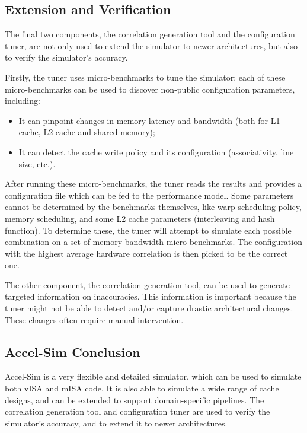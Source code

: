 \subsection{Extension and Verification}\label{subsec:extension-and-verification}
The final two components, the correlation generation tool and the configuration tuner, are not only used to extend the simulator to newer architectures, but also to verify the simulator's accuracy.

Firstly, the tuner uses micro-benchmarks to tune the simulator; each of these micro-benchmarks can be used to discover non-public configuration parameters, including:
\begin{itemize}
    \item It can pinpoint changes in memory latency and bandwidth (both for L1 cache, L2 cache and shared memory);
    \item It can detect the cache write policy and its configuration (associativity, line size, etc.).
\end{itemize}

After running these micro-benchmarks, the tuner reads the results and provides a configuration file which can be fed to the performance model.
Some parameters cannot be determined by the benchmarks themselves, like warp scheduling policy, memory scheduling, and some L2 cache parameters (interleaving and hash function).
To determine these, the tuner will attempt to simulate each possible combination on a set of memory bandwidth micro-benchmarks.
The configuration with the highest average hardware correlation is then picked to be the correct one.

\vspace{5mm}

The other component, the correlation generation tool, can be used to generate targeted information on inaccuracies.
This information is important because the tuner might not be able to detect and/or capture drastic architectural changes.
These changes often require manual intervention.

\subsection{Accel-Sim Conclusion}\label{subsec:accelsim-conclusion}
Accel-Sim is a very flexible and detailed simulator, which can be used to simulate both vISA and mISA code.
It is also able to simulate a wide range of cache designs, and can be extended to support domain-specific pipelines.
The correlation generation tool and configuration tuner are used to verify the simulator's accuracy, and to extend it to newer architectures.

